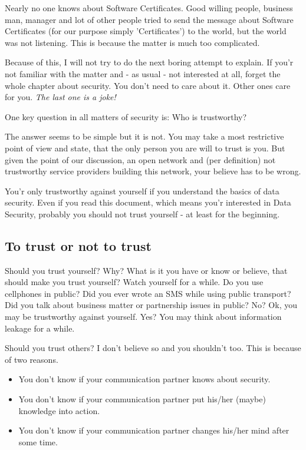 \documentclass[twoside,a4paper,english,12pt,authoryear,openright]{book}
\begin{document}
Nearly no one knows about Software Certificates. Good willing people, business man, manager and lot of other people tried to send the message about Software Certificates (for our purpose simply 'Certificates') to the world, but the world was not listening. This is because the matter is much too complicated.

Because of this, I will not try to do the next boring attempt to explain. If you'r not familiar with the matter and - as usual - not interested at all, forget the whole chapter about security. You don't need to care about it. Other ones care for you. \textit{The last one is a joke!}

One key question in all matters of security is: Who is trustworthy?

The answer seems to be simple but it is not. You may take a most restrictive point of view and state, that the only person you are will to trust is you. But given the point of our discussion, an open network and (per definition) not trustworthy service providers building this network, your believe has to be wrong.

You'r only trustworthy against yourself if you understand the basics of data security. Even if you read this document, which means you'r interested in Data Security, probably you should not trust yourself - at least for the beginning.

\subsection{To trust or not to trust}

Should you trust yourself? Why? What is it you have or know or believe, that should make you trust yourself? Watch yourself for a while. Do you use cellphones in public? Did you ever wrote an SMS while using public transport? Did you talk about business matter or partnership issues in public? No? Ok, you may be trustworthy against yourself. Yes? You may think about information leakage for a while.

Should you trust others? I don't believe so and you shouldn't too. This is because of two reasons.

\begin{itemize}
  \item {You don't know if your communication partner knows about security.}
  \item {You don't know if your communication partner put his/her (maybe) knowledge into action.}
  \item {You don't know if your communication partner changes his/her mind after some time.}
\end{itemize}
\end{document}
